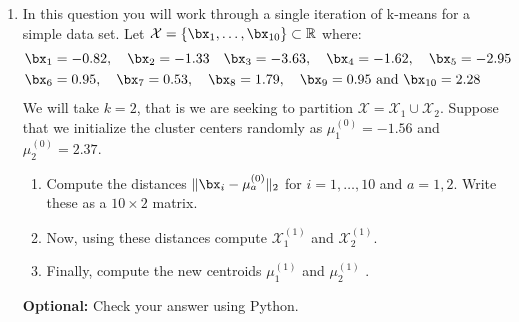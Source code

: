 \documentclass[10pt]{article}
\begin{document}
\begin{enumerate}
\item In this question you will work through a single iteration of k-means for a simple data set. Let $\mathcal{X} = \{\bx_1,\ldots, \bx_{10}\}\subset\mathbb{R}$ where:
\begin{align*}
& \bx_1 = -0.82, \quad \bx_2 = -1.33 \quad \bx_3 = -3.63, \quad \bx_4 = -1.62, \quad \bx_5 = -2.95 \\ 
& \bx_6 = 0.95, \quad \bx_7 = 0.53, \quad \bx_{8} = 1.79, \quad \bx_9 = 0.95 \text{ and } \bx_{10} = 2.28
\end{align*}
We will take $k = 2$, that is we are seeking to partition $\mathcal{X} = \mathcal{X}_1\cup\mathcal{X}_2$.  Suppose that we initialize the cluster centers randomly as $\mu_{1}^{(0)} = -1.56$ and $\mu_{2}^{(0)} = 2.37$.
\begin{enumerate}
	\item Compute the distances $\|\bx_{i} - \mu_{a}^{(0)}\|_{2}$ for $i=1,\ldots, 10$ and $a=1,2$. Write these as a $10\times 2$ matrix. \\
	\item Now, using these distances compute $\mathcal{X}_{1}^{(1)}$ and $\mathcal{X}_{2}^{(1)}$.
	\item Finally, compute the new centroids $\mu_1^{(1)}$ and $\mu_{2}^{(1)}$ .
\end{enumerate}
{\bf Optional:} Check your answer using Python. \\

\end{enumerate}
\end{document}
